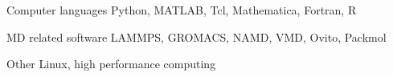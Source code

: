 
\begin{cvskills}
  
  \cvskill
    {Computer languages} %
    {Python, MATLAB, Tcl, Mathematica, Fortran, R} %

  \cvskill
    {MD related software} %
    {LAMMPS, GROMACS, NAMD, VMD, Ovito, Packmol} %
  
  \cvskill
    {Other} %
    {Linux, high performance computing} %
    
\end{cvskills}
